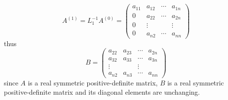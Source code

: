 \documentclass[12pt,a4paper]{article}
\begin{document}
\[
	A^{(1)} = L_1^{-1}A^{(0)} = \left(\begin{array}{cccc} 
	a_{11} & a_{12} & \cdots & a_{1n} \\
	0 & a_{22} & \cdots & a_{2n} \\
	0 & \vdots & & \vdots \\
	0 & a_{n2} & \cdots & a_{nn}
	\end{array}\right)
\]
thus 
\[
	B = \left( \begin{array}{cccc}
	 a_{22} & a_{23} & \cdots & a_{2n} \\
	 a_{32} & a_{33} & \cdots & a_{3n} \\
	 \vdots & & \vdots \\
	 a_{n2} & a_{n3} & \cdots & a_{nn}
	\end{array} \right) 
\]
since $A$ is a real symmetric positive-definite matrix,
$B$ is a real symmetric positive-definite matrix and its diagonal elements 
are unchanging.
\end{document}
